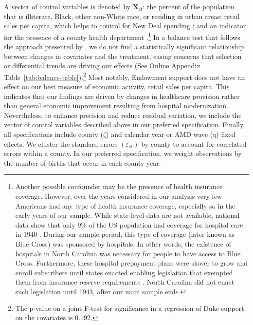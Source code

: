 \documentclass[12pt]{article}
\begin{document}
A vector of control variables is denoted by $\mathbf{X}_{ct}$: the percent of the population that is illiterate, Black, other non-White race, or residing in urban areas; retail sales per capita, which helps to control for New Deal spending ; and an indicator for the presence of a county health department .\footnote{
Another possible confounder may be the presence of health insurance coverage. 
However, over the years considered in our analysis very few Americans had any type of health insurance coverage, especially so in the early years of our sample. 
While state-level data are not available, national data show that only 9\% of the US population had coverage for hospital care in 1940 . 
During our sample period, this type of coverage (later known as Blue Cross) was sponsored by hospitals. In other words, the existence of hospitals in North Carolina was necessary for people to have access to Blue Cross. 
Furthermore, these hospital prepayment plans were slower to grow and enroll subscribers until states enacted enabling legislation that exempted them from insurance reserve requirements . 
North Carolina did not enact such legislation until 1943, after our main sample ends.
}
In a balance test that follows the approach presented by , we do not find a statistically significant relationship between changes in covariates and the treatment, easing concerns that selection or differential trends are driving our effects (See Online Appendix Table~\ref{tab:balance-table}).\footnote{The p-value on a joint F-test for significance in a regression of Duke support on the covariates is 0.192.} 
Most notably, Endowment support does not have an effect on our best measure of economic activity, retail sales per capita. 
This indicates that our findings are driven by changes in healthcare provision rather than  general economic improvement resulting from hospital modernization. Nevertheless, to enhance precision and reduce residual variation, we include the vector of control variables described above in our preferred specification. 
Finally, all specifications include county ($\zeta$) and calendar year or AMD wave ($\eta$) fixed effects.
We cluster the standard errors $(\varepsilon_{ct})$ by county to account for correlated errors within a county.
In our preferred specification, we weight observations by the number of births that occur in each county-year.
\end{document}
